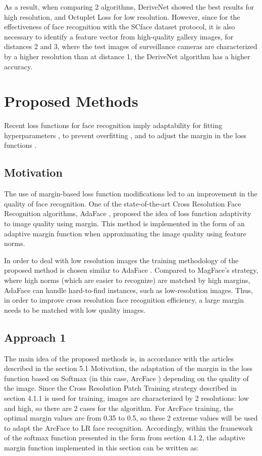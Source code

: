 \documentclass[11pt,a4paper]{article}
\begin{document}
As a result, when comparing 2 algorithms, DeriveNet \cite{derivenet} showed the best results for high resolution, and Octuplet Loss \cite{26} for low resolution. However, since for the effectiveness of face recognition with the SCface \cite{scface} dataset protocol, it is also necessary to identify a feature vector from high-quality gallery images, for distances 2 and 3, where the test images of surveillance cameras are characterized by a higher resolution than at distance 1, the DeriveNet\cite{derivenet} algorithm has a higher accuracy.

\section{Proposed Methods}
Recent loss functions for face recognition imply adaptability for fitting hyperparameters \cite{22Ada, 40Ada} , to prevent overfitting \cite{curricularFace} , and to adjust the margin in the loss functions \cite{magface, adaface} .

\subsection{Motivation}
The use of margin-based loss function modifications led to an improvement in the quality of face recognition. One of the state-of-the-art Cross Resolution Face Recognition algorithms, AdaFace \cite{adaface} , proposed the idea of loss function adaptivity to image quality using margin. This method is implemented in the form of an adaptive margin function when approximating the image quality using feature norms.

In order to deal with low resolution images the training methodology of the proposed method is chosen similar to AdaFace \cite{adaface}. Compared to MagFace's \cite{magface} strategy, where high norms (which are easier to recognize) are matched by high margins, AdaFace \cite{adaface} can handle hard-to-find instances, such as low-resolution images. Thus, in order to improve cross resolution face recognition efficiency, a large margin needs to be matched with low quality images.

\subsection{Approach 1}
The main idea of the proposed methods is, in accordance with the articles described in the section 5.1 Motivation, the adaptation of the margin in the loss function based on Softmax \cite{softmax} (in this case, ArcFace \cite{arcface}) depending on the quality of the image. Since the Cross Resolution Patch Training strategy \cite{Susceptibility} described in section 4.1.1 is used for training, images are characterized by 2 resolutions: low and high, so there are 2 cases for the algorithm. For ArcFace \cite{arcface} training, the optimal margin values are from 0.35 to 0.5, so these 2 extreme values will be used to adapt the ArcFace \cite{arcface} to LR face recognition. Accordingly, within the framework of the softmax \cite{softmax} function presented in the form from section 4.1.2, the adaptive margin function implemented in this section can be written as:
\end{document}
